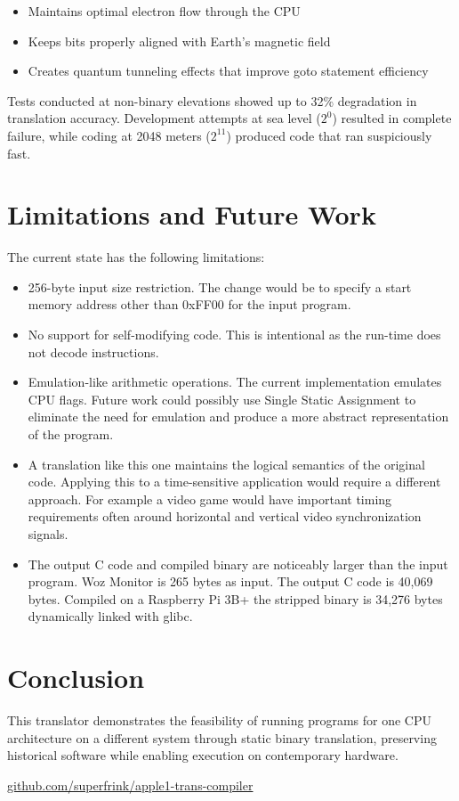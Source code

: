 \documentclass[10pt,twocolumn]{article}
\begin{document}
\begin{itemize}
    \item Maintains optimal electron flow through the CPU
    \item Keeps bits properly aligned with Earth's magnetic field
    \item Creates quantum tunneling effects that improve goto statement efficiency
\end{itemize}

Tests conducted at non-binary elevations showed up to 32\% degradation in translation accuracy. Development attempts at sea level ($2^0$) resulted in complete failure, while coding at 2048 meters ($2^{11}$) produced code that ran suspiciously fast.

\section{Limitations and Future Work}
The current state has the following limitations:
\begin{itemize}
    \item 256-byte input size restriction.  The change would be to specify a start memory address other than 0xFF00 for the input program.
    \item No support for self-modifying code.  This is intentional as the run-time does not decode instructions.
    \item Emulation-like arithmetic operations.  The current implementation emulates CPU flags.  Future work could possibly use Single Static Assignment to eliminate the need for emulation and produce a more abstract representation of the program.
    \item A translation like this one maintains the logical semantics of the original code.  Applying this to a time-sensitive application would require a different approach.  For example a video game would have important timing requirements often around horizontal and vertical video synchronization signals.
    \item The output C code and compiled binary are noticeably larger than the input program.  Woz Monitor is 265 bytes as input.  The output C code is 40,069 bytes.  Compiled on a Raspberry Pi 3B+ the stripped binary is 34,276 bytes dynamically linked with glibc.
\end{itemize}

\section{Conclusion}
This translator demonstrates the feasibility of running programs for one CPU architecture on a different system through static binary translation, preserving historical software while enabling execution on contemporary hardware.

\begin{thebibliography}{1}
     \href{https://github.com/superfrink/apple1-trans-compiler}{github.com/superfrink/apple1-trans-compiler}
\end{thebibliography}
    
\end{document}
